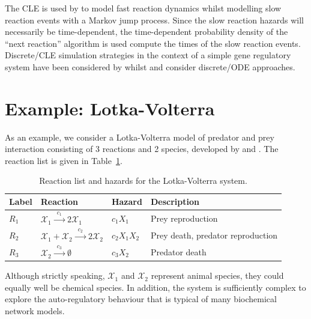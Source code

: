 \documentclass[12pt, DIV12]{scrartcl}
\begin{document}
The CLE is used by \cite{salis2005} to model fast reaction dynamics whilst
modelling slow reaction events with a Markov jump process. Since the slow
reaction hazards will necessarily be time-dependent, the time-dependent
probability density of the ``next reaction'' algorithm is used compute the times
of the slow reaction events. Discrete/CLE simulation strategies in the context
of a simple gene regulatory system have been considered by \cite{higham2011}
whilst \cite{kiehl2004} and \cite{alfonsi2005} consider discrete/ODE approaches.

   
\section{Example: Lotka-Volterra}

As an example, we consider a Lotka-Volterra model of predator and prey
interaction consisting of 3 reactions and 2 species, developed by
\cite{lotka1925} and \cite{volterra1926}. The reaction list is given in
Table~\ref{tab:tab2}.
\begin{table}[t]
\centering
\begin{tabular}{@{}llll@{}}
  \toprule
  Label  & Reaction &  Hazard & Description\\
  \midrule
  $R_{1}$ & $\mathcal{X}_{1}\xrightarrow{\phantom{a}c_{1}\phantom{a}}  2\mathcal{X}_{1}$ & $c_{1}X_{1}$ & Prey reproduction\\
  $R_{2}$ & $\mathcal{X}_{1}+\mathcal{X}_{2}\xrightarrow{\phantom{a}c_{2}\phantom{a}}  2\mathcal{X}_{2}$ & $c_{2}X_{1}X_{2}$ & Prey death, predator reproduction\\
  $R_{3}$ & $\mathcal{X}_{2}\xrightarrow{\phantom{a}c_{3}\phantom{a}}  \emptyset$ & $c_{3}X_{2}$ & Predator death\\
  \bottomrule
\end{tabular}
\caption{Reaction list and hazards for the Lotka-Volterra system.}\label{tab:tab2}
\end{table} 
Although strictly speaking, $\mathcal{X}_{1}$ and $\mathcal{X}_{2}$ represent
animal species, they could equally well be chemical species. In addition, the
system is sufficiently complex to explore the auto-regulatory behaviour that is
typical of many biochemical network models.
\end{document}
